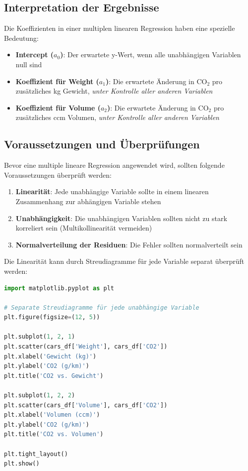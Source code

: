 \subsection{Interpretation der Ergebnisse}

Die Koeffizienten in einer multiplen linearen Regression haben eine spezielle Bedeutung:

\begin{itemize}
	\item \textbf{Intercept ($a_0$)}: Der erwartete y-Wert, wenn alle unabhängigen Variablen null sind
	\item \textbf{Koeffizient für Weight ($a_1$)}: Die erwartete Änderung in CO$_2$ pro zusätzliches kg Gewicht, \textit{unter Kontrolle aller anderen Variablen}
	\item \textbf{Koeffizient für Volume ($a_2$)}: Die erwartete Änderung in CO$_2$ pro zusätzliches ccm Volumen, \textit{unter Kontrolle aller anderen Variablen}
\end{itemize}

\subsection{Voraussetzungen und Überprüfungen}

Bevor eine multiple lineare Regression angewendet wird, sollten folgende Voraussetzungen überprüft werden:

\begin{enumerate}
	\item \textbf{Linearität}: Jede unabhängige Variable sollte in einem linearen Zusammenhang zur abhängigen Variable stehen
	\item \textbf{Unabhängigkeit}: Die unabhängigen Variablen sollten nicht zu stark korreliert sein (Multikollinearität vermeiden)
	\item \textbf{Normalverteilung der Residuen}: Die Fehler sollten normalverteilt sein
\end{enumerate}

Die Linearität kann durch Streudiagramme für jede Variable separat überprüft werden:

\begin{lstlisting}[language=Python]
import matplotlib.pyplot as plt

# Separate Streudiagramme für jede unabhängige Variable
plt.figure(figsize=(12, 5))

plt.subplot(1, 2, 1)
plt.scatter(cars_df['Weight'], cars_df['CO2'])
plt.xlabel('Gewicht (kg)')
plt.ylabel('CO2 (g/km)')
plt.title('CO2 vs. Gewicht')

plt.subplot(1, 2, 2)
plt.scatter(cars_df['Volume'], cars_df['CO2'])
plt.xlabel('Volumen (ccm)')
plt.ylabel('CO2 (g/km)')
plt.title('CO2 vs. Volumen')

plt.tight_layout()
plt.show()
\end{lstlisting}

